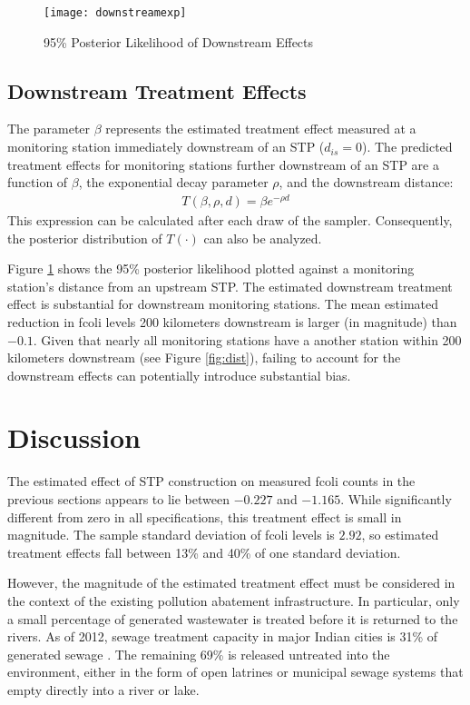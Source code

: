 \documentclass[12pt]{article}
\newcommand{\anum}[1]{\begin{align}#1\end{align}}
\begin{document}
\begin{figure}[t] \centering 
	\texttt{[image: downstreamexp]}
	\caption{95\% Posterior Likelihood of Downstream Effects}
	\label{fig:downstreamexp}
\end{figure}

\subsection{Downstream Treatment Effects}

The parameter $\beta$ represents the estimated treatment effect measured at a monitoring station immediately downstream of an STP ($d_{is} = 0$). The predicted treatment effects for monitoring stations further downstream of an STP are a function of $\beta$, the exponential decay parameter $\rho$, and the downstream distance:
\anum{
  T(\beta, \rho, d) = \beta e^{-\rho d} \label{eq:downstream}
}
This expression can be calculated after each draw of the sampler. Consequently, the posterior distribution of $T(\cdot)$ can also be analyzed. 

Figure \ref{fig:downstreamexp} shows the 95\% posterior likelihood plotted against a monitoring station's distance from an upstream STP. The estimated downstream treatment effect is substantial for downstream monitoring stations. The mean estimated reduction in fcoli levels 200 kilometers downstream is larger (in magnitude) than $-0.1$. Given that nearly all monitoring stations have a another station within 200 kilometers downstream (see Figure \ref{fig:dist}), failing to account for the downstream effects can potentially introduce substantial bias. 



\section{Discussion} \label{sec:disc}

The estimated effect of STP construction on measured fcoli counts in the previous sections appears to lie between $-0.227$ and $-1.165$. While significantly different from zero in all specifications, this treatment effect is small in magnitude. The sample standard deviation of fcoli levels is $2.92$, so estimated treatment effects fall between 13\% and 40\% of one standard deviation. 

However, the magnitude of the estimated treatment effect must be considered in the context of the existing pollution abatement infrastructure. In particular, only a small percentage of generated wastewater is treated before it is returned to the rivers. As of 2012, sewage treatment capacity in major Indian cities is 31\% of generated sewage \citep{kaur2012}. The remaining 69\% is released untreated into the environment, either in the form of open latrines or municipal sewage systems that empty directly into a river or lake.
\end{document}
